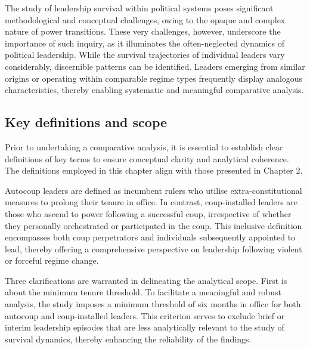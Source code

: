 \documentclass[
  12pt,
]{report}
\begin{document}
The study of leadership survival within political systems poses
significant methodological and conceptual challenges, owing to the
opaque and complex nature of power transitions. These very challenges,
however, underscore the importance of such inquiry, as it illuminates
the often-neglected dynamics of political leadership. While the survival
trajectories of individual leaders vary considerably, discernible
patterns can be identified. Leaders emerging from similar origins or
operating within comparable regime types frequently display analogous
characteristics, thereby enabling systematic and meaningful comparative
analysis.

\subsection*{Key definitions and scope}\label{key-definitions-and-scope}

Prior to undertaking a comparative analysis, it is essential to
establish clear definitions of key terms to ensure conceptual clarity
and analytical coherence. The definitions employed in this chapter align
with those presented in Chapter 2.

Autocoup leaders are defined as incumbent rulers who utilise
extra-constitutional measures to prolong their tenure in office. In
contrast, coup-installed leaders are those who ascend to power following
a successful coup, irrespective of whether they personally orchestrated
or participated in the coup. This inclusive definition encompasses both
coup perpetrators and individuals subsequently appointed to lead,
thereby offering a comprehensive perspective on leadership following
violent or forceful regime change.

Three clarifications are warranted in delineating the analytical scope.
First is about the minimum tenure threshold. To facilitate a meaningful
and robust analysis, the study imposes a minimum threshold of six months
in office for both autocoup and coup-installed leaders. This criterion
serves to exclude brief or interim leadership episodes that are less
analytically relevant to the study of survival dynamics, thereby
enhancing the reliability of the findings.
\end{document}
